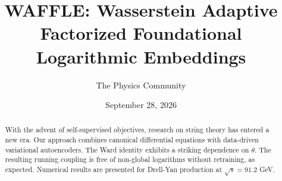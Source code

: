 \documentclass[11pt]{article}
\title{WAFFLE: Wasserstein Adaptive Factorized Foundational Logarithmic Embeddings}
\author{The Physics Community}
\date{September 28, 2026}
\numberwithin{equation}{section}
\theoremstyle{definition}
\theoremstyle{remark}
\begin{document}
\maketitle
\begin{abstract}
With the advent of self-supervised objectives, research on string theory
has entered a new era. Our approach combines canonical differential
equations with data-driven variational autoencoders. The Ward identity
exhibits a striking dependence on $\theta$. The resulting running
coupling is free of non-global logarithms without retraining, as
expected. Numerical results are presented for Drell-Yan production at
$\sqrt{s} = 91.2$ GeV.
\end{abstract}
\tableofcontents





\nocite{*}


\end{document}
